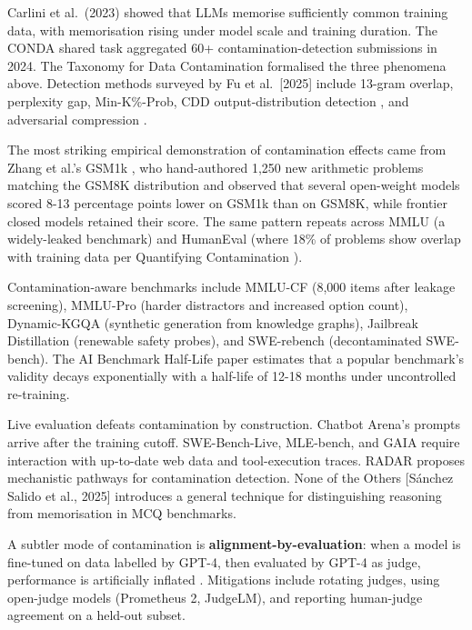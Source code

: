 \documentclass{article}
\begin{document}
Carlini et al.~(2023) showed that LLMs memorise sufficiently common training data, with memorisation rising under model scale and training duration. The CONDA shared task \cite{sainz20242024} aggregated 60+ contamination-detection submissions in 2024. The Taxonomy for Data Contamination \cite{palavalli2024ataxonomyfordataco} formalised the three phenomena above. Detection methods surveyed by Fu et al.~{[}2025{]} include 13-gram overlap, perplexity gap, Min-K\%-Prob, CDD output-distribution detection \cite{sela2026nomemorizationnode}, and adversarial compression \cite{schwarzschild20242024}.

The most striking empirical demonstration of contamination effects came from Zhang et al.'s GSM1k \cite{zhang20242024}, who hand-authored 1,250 new arithmetic problems matching the GSM8K distribution and observed that several open-weight models scored 8-13 percentage points lower on GSM1k than on GSM8K, while frontier closed models retained their score. The same pattern repeats across MMLU (a widely-leaked benchmark) and HumanEval (where 18\% of problems show overlap with training data per Quantifying Contamination \cite{riddell2024quantifyingcontami}).

Contamination-aware benchmarks include MMLU-CF \cite{zhao20242024} (8,000 items after leakage screening), MMLU-Pro \cite{wang20242024} (harder distractors and increased option count), Dynamic-KGQA \cite{dammu2025dynamickgqaascalab} (synthetic generation from knowledge graphs), Jailbreak Distillation \cite{zhang20252025} (renewable safety probes), and SWE-rebench \cite{badertdinov20252025} (decontaminated SWE-bench). The AI Benchmark Half-Life paper \cite{white20242024} estimates that a popular benchmark's validity decays exponentially with a half-life of 12-18 months under uncontrolled re-training.

Live evaluation defeats contamination by construction. Chatbot Arena's prompts arrive after the training cutoff. SWE-Bench-Live, MLE-bench, and GAIA require interaction with up-to-date web data and tool-execution traces. RADAR \cite{kattamuri20252025} proposes mechanistic pathways for contamination detection. None of the Others {[}Sánchez Salido et al., 2025{]} introduces a general technique for distinguishing reasoning from memorisation in MCQ benchmarks.

A subtler mode of contamination is \textbf{alignment-by-evaluation}: when a model is fine-tuned on data labelled by GPT-4, then evaluated by GPT-4 as judge, performance is artificially inflated \cite{wei20242024}. Mitigations include rotating judges, using open-judge models (Prometheus 2, JudgeLM), and reporting human-judge agreement on a held-out subset.
\end{document}
